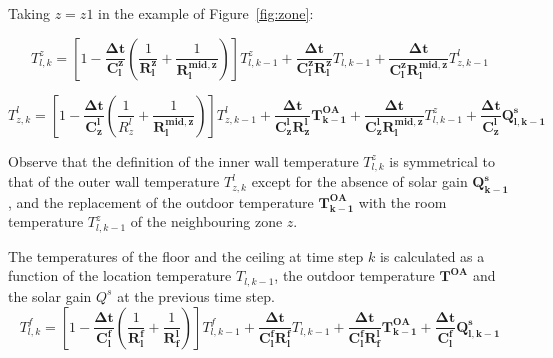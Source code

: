 Taking $z=z1$ in the example of Figure~\ref{fig:zone}:

\begin{equation}\label{eq:temp:outer}
T^{z}_{l,k} = 
\left[ 1 - \frac{\bm{\Delta t}}{\bm{C_l^z}} (\frac{1}{\bm{R^z_l}} +  \frac{1}{\bm{R^{mid,z}_l}} )  \right] T^{z}_{l,k-1} + 
\frac{\bm{\Delta t}}{{\bm{C_l^z}}{\bm{R^z_l}}} T_{l,k-1} + 
\frac{\bm{\Delta t}}{{\bm{C_l^z}}{\bm{R^{mid,z}_l}}} T^{l}_{z,k-1} 
\end{equation}

\begin{equation}\label{eq:temp:inner}
T^{l}_{z,k} = 
\left[ 1 - \frac{\bm{\Delta t}}{\bm{C_z^l}} (\frac{1}{{R}^{l}_z} +  \frac{1}{\bm{R^{mid,z}_l}} )  \right] T^{l}_{z,k-1} + 
\frac{\bm{\Delta t}}{{\bm{C_z^l}}{\bm{R^l_z}}} \bm{T^{OA}_{k-1}} + 
\frac{\bm{\Delta t}}{{\bm{C_z^l}}{\bm{R^{mid,z}_l}}} T^{z}_{l,k-1} +
\frac{\bm{\Delta t}}{{\bm{C_z^l}}} \bm{Q^{s}_{l,k-1}}
\end{equation}

\noindent Observe that the definition of the inner wall temperature $T^{z}_{l,k}$ is symmetrical to that of the outer wall temperature $T^{l}_{z,k}$ except for the absence of solar gain $\bm{Q^s_{k-1}}$, and the replacement of the outdoor temperature $\bm{T^{OA}_{k-1}}$ with the room temperature $T^{z}_{l,k-1}$ of the neighbouring zone $z$.


The temperatures of the floor and the ceiling at time step $k$ is calculated as a function of the location temperature $T_{l,k-1}$, the outdoor temperature $\bm{T^{OA}}$ and the solar gain $Q^{s}$ at the previous time step. 
\begin{equation}\label{eq:tlf}
T^{f}_{l,k} = 
\left[ 1 - \frac{\bm{\Delta t}}{\bm{C_l^f}} (\frac{1}{\bm{R^f_l}} +  \frac{1}{\bm{R^l_f}} )  \right] T^{f}_{l,k-1} + 
\frac{\bm{\Delta t}}{{\bm{C_l^f}}{\bm{R^f_l}}} T_{l,k-1} + 
\frac{\bm{\Delta t}}{{\bm{C_l^f}}{\bm{R^l_f}}} \bm{T^{OA}_{k-1}} +
\frac{\bm{\Delta t}}{{\bm{C_l^f}}} \bm{Q^{s}_{l,k-1}}
\end{equation}

